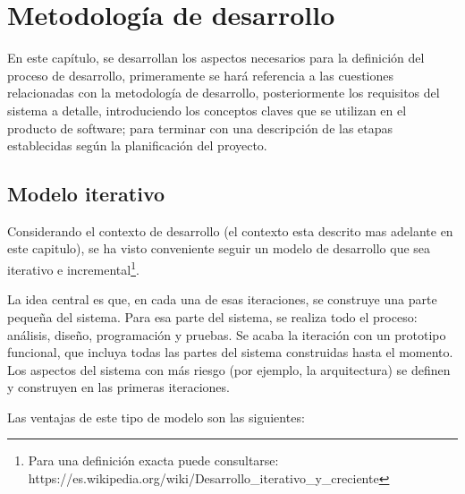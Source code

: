 \chapter{Metodología de desarrollo}

En este capítulo, se desarrollan los aspectos necesarios para la definición del 
proceso de desarrollo, primeramente se hará referencia a las cuestiones 
relacionadas con la metodología de desarrollo, posteriormente los requisitos del
sistema a detalle, introduciendo los conceptos claves que se utilizan en el
producto de software; para terminar con una descripción de las etapas
establecidas según la planificación del proyecto.

\section{Modelo iterativo}

Considerando el contexto de desarrollo (el contexto esta descrito mas adelante
en este capitulo), se ha visto conveniente seguir un modelo de desarrollo que
sea iterativo e incremental\footnote{Para una definición exacta puede
consultarse: https://es.wikipedia.org/wiki/Desarrollo\_iterativo\_y\_creciente}.

La idea central es que, en cada una de esas iteraciones, se construye una parte
pequeña del sistema. Para esa parte del sistema, se realiza todo el proceso:
análisis, diseño, programación y pruebas. Se acaba la iteración con un
prototipo funcional, que incluya todas las partes del sistema construidas hasta
el momento. Los aspectos del sistema con más riesgo (por ejemplo, la
arquitectura) se definen y construyen en las primeras iteraciones.

Las ventajas de este tipo de modelo son las siguientes:

